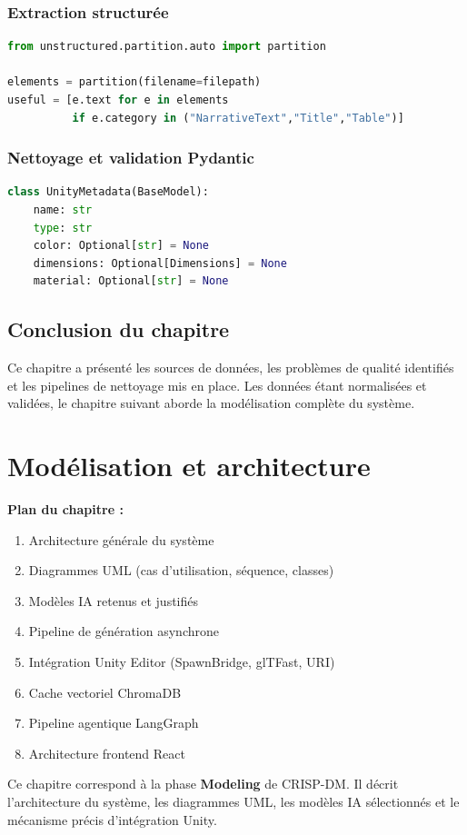 \documentclass[12pt,a4paper,oneside]{report}
\newcommand{\chapterintro}[2]{%
  \begin{tcolorbox}[colback=tekupblue!4,colframe=tekupblue!40,
    boxrule=0.6pt,arc=4pt,left=10pt,right=10pt,top=6pt,bottom=6pt]
  \small\textbf{Plan du chapitre :}\\[3pt]#1
  \end{tcolorbox}
  \vspace{6pt}\noindent #2\vspace{10pt}
}
\begin{document}
\subsection{Extraction structurée}
\begin{lstlisting}[language=Python,
  caption={Partitionnement sémantique --- document\_parser.py}]
from unstructured.partition.auto import partition

elements = partition(filename=filepath)
useful = [e.text for e in elements
          if e.category in ("NarrativeText","Title","Table")]
\end{lstlisting}

\subsection{Nettoyage et validation Pydantic}
\begin{lstlisting}[language=Python,
  caption={Modèle de validation Pydantic}]
class UnityMetadata(BaseModel):
    name: str
    type: str
    color: Optional[str] = None
    dimensions: Optional[Dimensions] = None
    material: Optional[str] = None
\end{lstlisting}

\section*{Conclusion du chapitre}

Ce chapitre a présenté les sources de données, les problèmes de qualité
identifiés et les pipelines de nettoyage mis en place. Les données étant
normalisées et validées, le chapitre suivant aborde la modélisation
complète du système.

\chapter{Modélisation et architecture}

\chapterintro{%
  \begin{enumerate}[noitemsep,leftmargin=*]
    \item Architecture générale du système
    \item Diagrammes UML (cas d'utilisation, séquence, classes)
    \item Modèles IA retenus et justifiés
    \item Pipeline de génération asynchrone
    \item Intégration Unity Editor (SpawnBridge, glTFast, URI)
    \item Cache vectoriel ChromaDB
    \item Pipeline agentique LangGraph
    \item Architecture frontend React
  \end{enumerate}
}{%
  Ce chapitre correspond à la phase \textbf{Modeling} de CRISP-DM. Il
  décrit l'architecture du système, les diagrammes UML, les modèles IA
  sélectionnés et le mécanisme précis d'intégration Unity.
}
\end{document}
